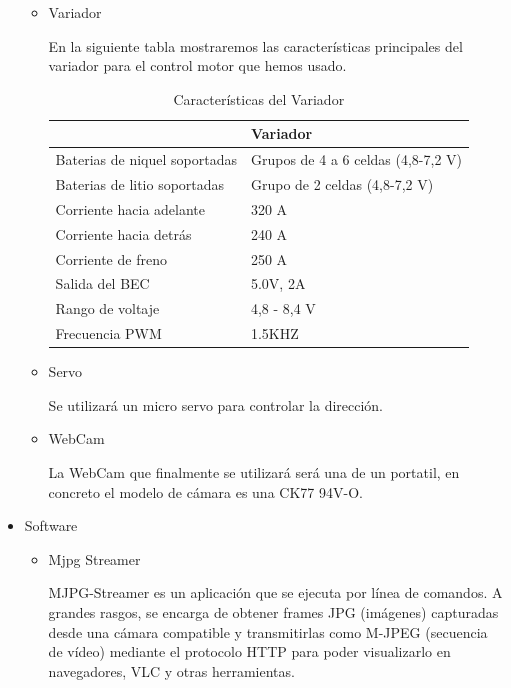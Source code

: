 \documentclass{pclass}
\begin{document}
\begin{itemize}
\begin{itemize}
			\clearpage
			\item Variador
			
				En la siguiente tabla mostraremos las características principales del variador para el control motor que hemos usado.
				
				\begin{table}[H]
					\begin{center}
						\begin{tabular}{|l|l|}
							\hline
							& Variador \\
							\hline \hline
							Baterias de niquel soportadas & Grupos de 4 a 6 celdas (4,8-7,2 V) \\ \hline
							Baterias de litio soportadas & Grupo de 2 celdas (4,8-7,2 V) \\ \hline
							Corriente hacia adelante & 320 A \\ \hline
							Corriente  hacia detrás & 240 A \\ \hline
							Corriente de freno & 250 A \\ \hline
							Salida del BEC & 5.0V, 2A\\ \hline
							Rango de voltaje & 4,8 - 8,4 V \\ \hline
							Frecuencia PWM & 1.5KHZ \\ \hline
						\end{tabular}
						\caption{Características del Variador}
						\label{tabla:variador}
					\end{center}
				\end{table}
			
			
			\item Servo
			
				Se utilizará un micro servo para controlar la dirección.
				
			\item WebCam
				
				La WebCam que finalmente se utilizará será una de un portatil, en concreto el modelo de cámara es una CK77 94V-O.
		\end{itemize}
	\item Software
	\begin{itemize}
		\item Mjpg Streamer
		
		MJPG-Streamer es un aplicación que se ejecuta por línea de comandos. A grandes rasgos, se encarga de obtener frames JPG (imágenes) capturadas desde una cámara compatible y transmitirlas como M-JPEG (secuencia de vídeo) mediante el protocolo HTTP para poder visualizarlo en navegadores, VLC y otras herramientas.
			\cite{mjpg}
		

\end{itemize}
\end{itemize}
\end{document}
